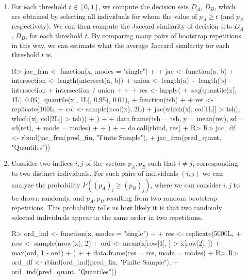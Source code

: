 \documentclass[
  nojss]{jss}
\begin{document}
\begin{enumerate}

\item For each threshold $t \in [0, 1]$, we compute the decision sets $D_A$, $D_B$, which are obtained by selecting all individuals for whom the value of $p_A \geq t$ (and $p_B$ respectively). We can then compute the Jaccard similarity of decision sets $D_A$, $D_B$, for each threshold $t$. By comparing many pairs of bootstrap repetitions in this way, we can estimate what the average Jaccard similarity for each threshold $t$ is.

\begin{CodeChunk}
\begin{CodeInput}
R> jac_frm <- function(x, modes = "single") {
+ 
+   jac <- function(a, b) {
+     intersection <- length(intersect(a, b))
+     union <- length(a) + length(b) - intersection
+     intersection / union
+   }
+ 
+   res <- lapply(
+     seq(quantile(x[, 1L], 0.05), quantile(x[, 1L], 0.95), 0.01),
+     function(tsh) {
+ 
+       ret <- replicate(100L, {
+         col <- sample(ncol(x), 2L)
+         jac(which(x[, col[1L]] > tsh), which(x[, col[2L]] > tsh))
+       })
+ 
+       data.frame(tsh = tsh, y = mean(ret), sd = sd(ret),
+                  mode = modes)
+     }
+   )
+ 
+   do.call(rbind, res)
+ }
R> 
R> jac_df <- rbind(jac_frm(pred_fin, "Finite Sample"),
+                 jac_frm(pred_quant, "Quantiles"))
\end{CodeInput}
\end{CodeChunk}

\item Consider two indices $i, j$ of the vectors $p_A, p_B$ such that $i \neq j$, corresponding to two distinct individuals. For such pairs of individuals $(i, j)$ we can analyze the probability $P((p_A)_i \geq (p_B)_j)$, where we can consider $i, j$ to be drawn randomly, and $p_A, p_B$ resulting from two random bootstrap repetitions. This probability tells us how likely it is that two randomly selected individuals appear in the same order in two repetitions.

\begin{CodeChunk}
\begin{CodeInput}
R> ord_ind <- function(x, modes = "single") {
+ 
+   res <- replicate(5000L, {
+     row <- sample(nrow(x), 2)
+     ord <- mean(x[row[1], ] > x[row[2], ])
+     max(ord, 1 - ord)
+   })
+ 
+   data.frame(res = res, mode = modes)
+ }
R> 
R> ord_df <- rbind(ord_ind(pred_fin, "Finite Sample"),
+                 ord_ind(pred_quant, "Quantiles"))
\end{CodeInput}
\end{CodeChunk}


\end{enumerate}
\end{document}
